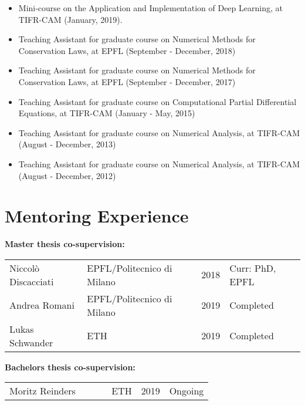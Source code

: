 \documentclass[margin]{res}
\begin{document}
\begin{resume}
               \begin{itemize} \itemsep -2pt
               \item Mini-course on the Application and Implementation of Deep Learning, at TIFR-CAM (January, 2019).
               \item Teaching Assistant for graduate course on Numerical Methods for Conservation Laws, at EPFL (September - December, 2018)
                \item Teaching Assistant for graduate course on Numerical Methods for Conservation Laws, at EPFL (September - December, 2017)
               \item Teaching Assistant for graduate course on Computational Partial Differential Equations, at TIFR-CAM (January - May, 2015)
               \item Teaching Assistant for graduate course on Numerical Analysis, at TIFR-CAM  (August - December, 2013) 
               \item Teaching Assistant for graduate course on Numerical Analysis, at TIFR-CAM   (August - December, 2012)
               \end{itemize}          
               
\section{Mentoring Experience} 
               
                  \textbf{Master thesis co-supervision:}
                  \vspace{-0.3cm}
                      \begin{table}[!h]
                       \begin{tabular}{llll}
                       Niccol\`{o} Discacciati & EPFL/Politecnico di Milano & 2018 & Curr: PhD, EPFL \\
                       Andrea Romani       & EPFL/Politecnico di Milano & 2019 & Completed                 \\
                       Lukas Schwander    & ETH                                         &  2019 &  Completed             
                        \end{tabular}
                        \end{table}
                     
                     \vspace{-0.5cm}   
                     \textbf{Bachelors thesis co-supervision:}
                     \vspace{-0.3cm}
                      \begin{table}[!h]
                       \begin{tabular}{llll}
                       Moritz Reinders \ \ \ \ \ &  ETH                  \hspace{3.2cm}                       &  2019 &  Ongoing             
                        \end{tabular}
                        \end{table}   
                        \vspace{-0.5cm}
                                    


\end{resume}
\end{document}
